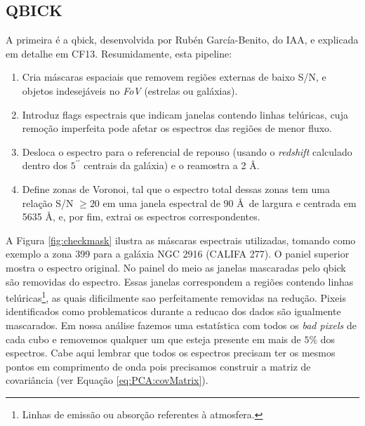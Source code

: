 \subsection{QBICK}

A primeira é a {\sc qbick}, desenvolvida por Rubén García-Benito, do IAA, e explicada em detalhe em CF13. Resumidamente,
esta pipeline:

\begin{enumerate}
\item Cria máscaras espaciais que removem regiões externas de baixo S/N, e objetos indesejáveis no {\em FoV} (estrelas
ou galáxias).
\item Introduz flags espectrais que indicam janelas contendo linhas telúricas, cuja remoção imperfeita pode afetar os
espectros das regiões de menor fluxo.
\item Desloca o espectro para o referencial de repouso (usando o {\em redshift} calculado dentro dos $5^{\prime\prime}$
centrais da galáxia) e o reamostra a 2 \AA.
\item Define zonas de Voronoi, tal que o espectro total dessas zonas tem uma relação S/N $\ge 20$ em uma janela
espectral de 90 \AA\ de largura e centrada em 5635 \AA, e, por fim, extrai os espectros correspondentes.
\end{enumerate}

A Figura \ref{fig:checkmask} ilustra as máscaras espectrais utilizadas, tomando como exemplo a zona 399 para a galáxia
NGC 2916 (CALIFA 277). O paniel superior mostra o espectro original. No painel do meio as janelas mascaradas pelo {\sc
qbick} são removidas do espectro. Essas janelas correspondem a regiões contendo linhas telúricas\footnote{Linhas de
emissão ou absorção referentes à atmosfera.}, as quais dificilmente sao perfeitamente removidas na redução. Pixeis
identificados como problematicos durante a reducao dos dados são igualmente mascarados. Em nossa análise fazemos uma
estatística com todos os {\em bad pixels} de cada cubo e removemos qualquer um que esteja presente em mais de $5\%$ dos
espectros. Cabe aqui lembrar que todos os espectros precisam ter os mesmos pontos em comprimento de onda pois precisamos
construir a matriz de covariância (ver Equação \ref{eq:PCA:covMatrix}).
                                                                                                                                                                                                                                                                               
